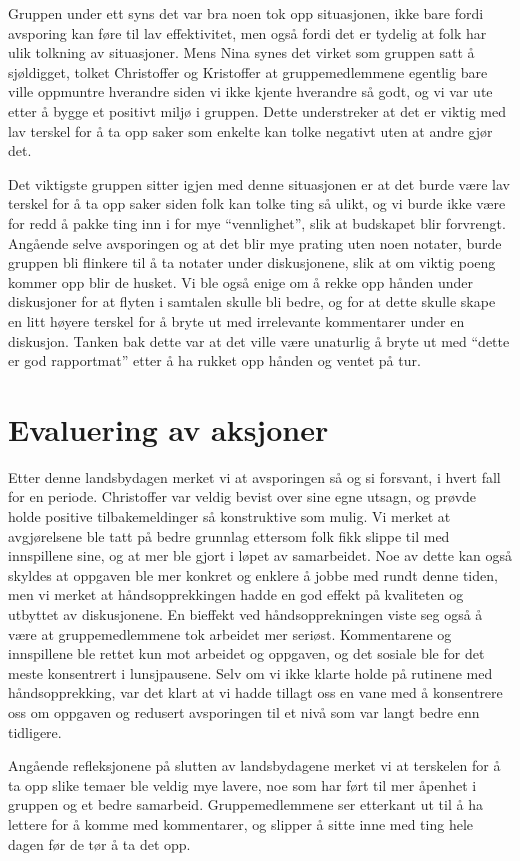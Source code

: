 Gruppen under ett syns det var bra noen tok opp situasjonen, ikke bare fordi avsporing kan føre til lav effektivitet, men også fordi det 
er tydelig at folk har ulik tolkning av situasjoner. Mens Nina synes det virket som gruppen satt å sjøldigget, tolket Christoffer og 
Kristoffer at gruppemedlemmene egentlig bare ville oppmuntre hverandre siden vi ikke kjente hverandre så godt, og vi var ute etter å 
bygge et positivt miljø i gruppen. Dette understreker at det er viktig med lav terskel for å ta opp saker som enkelte kan tolke negativt 
uten at andre gjør det.

Det viktigste gruppen sitter igjen med denne situasjonen er at det burde være lav terskel for å ta opp saker siden folk kan tolke ting så 
ulikt, og vi burde ikke være for redd å pakke ting inn i for mye ``vennlighet'', slik at budskapet blir forvrengt. Angående selve avsporingen 
og at det blir mye prating uten noen notater, burde gruppen bli flinkere til å ta notater under diskusjonene, slik at om viktig poeng 
kommer opp blir de husket. Vi ble også enige om å rekke opp hånden under diskusjoner for at flyten i samtalen skulle bli bedre, og for at dette skulle skape en litt høyere terskel for å bryte ut med irrelevante kommentarer under en diskusjon. Tanken bak dette var at det ville være unaturlig å bryte ut med ``dette er god rapportmat'' etter å ha rukket opp hånden og ventet på tur.

\section{Evaluering av aksjoner}

Etter denne landsbydagen merket vi at avsporingen så og si forsvant, i hvert fall for en periode. Christoffer var veldig bevist over sine egne utsagn, og prøvde holde positive tilbakemeldinger så konstruktive som mulig. Vi merket at avgjørelsene ble tatt på bedre grunnlag ettersom folk fikk slippe til med innspillene sine, og at mer ble gjort i løpet av samarbeidet. Noe av dette kan også skyldes at oppgaven ble mer konkret og enklere å jobbe med rundt denne tiden, men vi merket at håndsopprekkingen hadde en god effekt på kvaliteten og utbyttet av diskusjonene. En bieffekt ved håndsopprekningen viste seg også å være at gruppemedlemmene tok arbeidet mer seriøst. Kommentarene og innspillene ble rettet kun mot arbeidet og oppgaven, og det sosiale ble for det meste konsentrert i lunsjpausene. Selv om vi ikke klarte holde på rutinene med håndsopprekking, var det klart at vi hadde tillagt oss en vane med å konsentrere oss om oppgaven og redusert avsporingen til et nivå som var langt bedre enn tidligere.

Angående refleksjonene på slutten av landsbydagene merket vi at terskelen for å ta opp slike temaer ble veldig mye lavere, noe som har ført til mer åpenhet i gruppen og et bedre samarbeid. Gruppemedlemmene ser etterkant ut til å ha lettere for å komme med kommentarer, og slipper å sitte inne med ting hele dagen før de tør å ta det opp.


